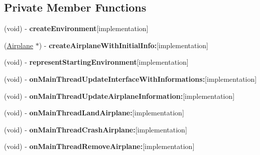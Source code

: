 \subsection*{\-Private \-Member \-Functions}
\begin{DoxyCompactItemize}
\item 
\hypertarget{interface_environment_a6a1ffc692affc1318c14a68b0bc09c11}{
(void) -\/ {\bfseries create\-Environment}{\ttfamily  \mbox{[}implementation\mbox{]}}}
\label{interface_environment_a6a1ffc692affc1318c14a68b0bc09c11}

\item 
\hypertarget{interface_environment_a7e53d4cf14c0ffb0d4a25286352120ef}{
(\hyperlink{interface_airplane}{\-Airplane} $\ast$) -\/ {\bfseries create\-Airplane\-With\-Initial\-Info\-:}{\ttfamily  \mbox{[}implementation\mbox{]}}}
\label{interface_environment_a7e53d4cf14c0ffb0d4a25286352120ef}

\item 
\hypertarget{interface_environment_af9d8f10f317b6a72845caf4b63d6ab30}{
(void) -\/ {\bfseries represent\-Starting\-Environment}{\ttfamily  \mbox{[}implementation\mbox{]}}}
\label{interface_environment_af9d8f10f317b6a72845caf4b63d6ab30}

\item 
\hypertarget{interface_environment_ab9517f5b8b144ca437f77a3ab22fe76f}{
(void) -\/ {\bfseries on\-Main\-Thread\-Update\-Interface\-With\-Informations\-:}{\ttfamily  \mbox{[}implementation\mbox{]}}}
\label{interface_environment_ab9517f5b8b144ca437f77a3ab22fe76f}

\item 
\hypertarget{interface_environment_af9e11114725a1f4ec3bdda1d0ff97983}{
(void) -\/ {\bfseries on\-Main\-Thread\-Update\-Airplane\-Information\-:}{\ttfamily  \mbox{[}implementation\mbox{]}}}
\label{interface_environment_af9e11114725a1f4ec3bdda1d0ff97983}

\item 
\hypertarget{interface_environment_a2257810d6bc317ecb4877668bb2bafb1}{
(void) -\/ {\bfseries on\-Main\-Thread\-Land\-Airplane\-:}{\ttfamily  \mbox{[}implementation\mbox{]}}}
\label{interface_environment_a2257810d6bc317ecb4877668bb2bafb1}

\item 
\hypertarget{interface_environment_a95fc69d064b3dc0b7cb6ff0e77e38ab8}{
(void) -\/ {\bfseries on\-Main\-Thread\-Crash\-Airplane\-:}{\ttfamily  \mbox{[}implementation\mbox{]}}}
\label{interface_environment_a95fc69d064b3dc0b7cb6ff0e77e38ab8}

\item 
\hypertarget{interface_environment_a19bdd197b867a80910aab6643da359d7}{
(void) -\/ {\bfseries on\-Main\-Thread\-Remove\-Airplane\-:}{\ttfamily  \mbox{[}implementation\mbox{]}}}
\label{interface_environment_a19bdd197b867a80910aab6643da359d7}

\end{DoxyCompactItemize}


